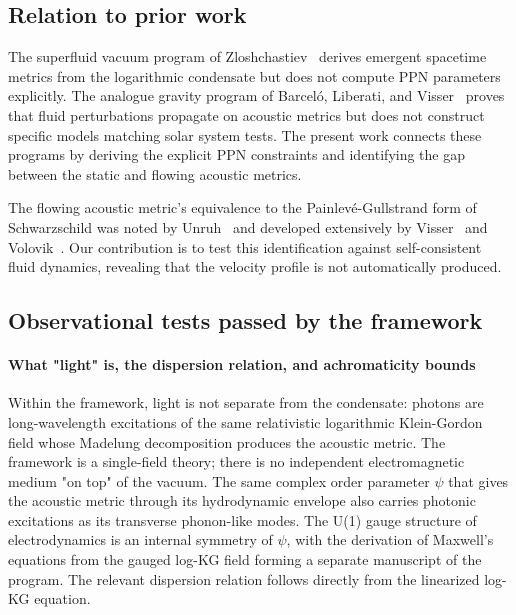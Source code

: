 \documentclass[12pt, a4paper]{article}
\begin{document}
\subsection{Relation to prior work}

The superfluid vacuum program of Zloshchastiev~\cite{zloshchastiev_2023,zloshchastiev_2020,zloshchastiev_2011} derives emergent spacetime metrics from the logarithmic condensate but does not compute PPN parameters explicitly. The analogue gravity program of Barcel\'{o}, Liberati, and Visser~\cite{barcelo_liberati_visser_2001,barcelo_liberati_visser_2005} proves that fluid perturbations propagate on acoustic metrics but does not construct specific models matching solar system tests. The present work connects these programs by deriving the explicit PPN constraints and identifying the gap between the static and flowing acoustic metrics.

The flowing acoustic metric's equivalence to the Painlev\'{e}-Gullstrand form of Schwarzschild was noted by Unruh~\cite{unruh_1981} and developed extensively by Visser~\cite{visser_1998} and Volovik~\cite{volovik_2003}. Our contribution is to test this identification against self-consistent fluid dynamics, revealing that the velocity profile is not automatically produced.

\subsection{Observational tests passed by the framework}

\paragraph{What "light" is, the dispersion relation, and achromaticity bounds}
Within the framework, light is not separate from the condensate: photons are long-wavelength excitations of the same relativistic logarithmic Klein-Gordon field whose Madelung decomposition produces the acoustic metric. The framework is a single-field theory; there is no independent electromagnetic medium "on top" of the vacuum. The same complex order parameter $\psi$ that gives the acoustic metric through its hydrodynamic envelope also carries photonic excitations as its transverse phonon-like modes. The U(1) gauge structure of electrodynamics is an internal symmetry of $\psi$, with the derivation of Maxwell's equations from the gauged log-KG field forming a separate manuscript of the program. The relevant dispersion relation follows directly from the linearized log-KG equation.
\end{document}
